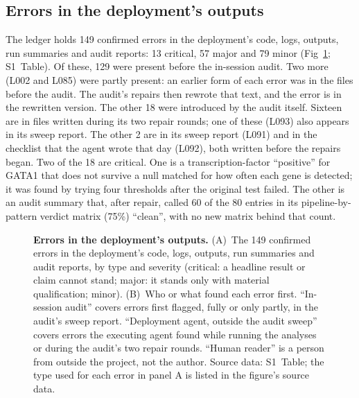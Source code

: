 \documentclass[10pt,letterpaper]{article}
\begin{document}
\subsection*{Errors in the deployment's outputs}
The ledger holds 149 confirmed errors in the deployment's code, logs,
outputs, run summaries and audit reports: 13 critical, 57 major and 79
minor (Fig~\ref{fig:ledger}; S1~Table). Of these, 129 were present before
the in-session audit. Two more (L002 and L085) were partly present: an earlier form of each error was in the files before the audit. The audit's repairs then rewrote that
text, and the error is in the rewritten version. The other 18 were introduced
by the audit itself. Sixteen are in files written during its two repair rounds;
one of these (L093) also appears in its sweep report. The other 2 are in
its sweep report (L091) and in the checklist that the agent wrote that
day (L092), both written before the repairs began. Two of the 18 are
critical. One is a transcription-factor ``positive'' for GATA1 that does
not survive a null matched for how often each gene is detected; it was
found by trying four thresholds after the original test failed. The
other is an audit summary that, after repair, called 60 of the 80
entries in its pipeline-by-pattern verdict matrix (75\%) ``clean'', with
no new matrix behind that count.

\begin{figure}[H]
\caption{\textbf{Errors in the deployment's outputs.} (A)~The 149
confirmed errors in the deployment's code, logs, outputs, run summaries
and audit reports, by type and severity (critical: a headline result or
claim cannot stand; major: it stands only with material qualification;
minor). (B)~Who or what found each error first. ``In-session audit''
covers errors first flagged, fully or only partly, in the audit's sweep
report. ``Deployment agent, outside the audit sweep'' covers errors the
executing agent found while running the analyses or during the audit's
two repair rounds. ``Human reader'' is a person from outside the
project, not the author.
Source data: S1~Table; the type used for each error in panel A is listed
in the figure's source data.}
\label{fig:ledger}
\end{figure}
\end{document}
